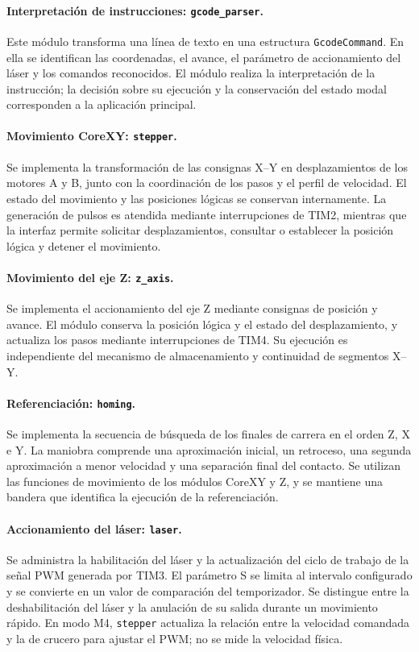 \documentclass[blue,fullpaper]{ludusofficial}  %
\begin{document}
\paragraph{Interpretación de instrucciones:
\texttt{gcode\_parser}.}
Este módulo transforma una línea de texto en una
estructura \texttt{GcodeCommand}. En ella se identifican
las coordenadas, el avance, el parámetro de accionamiento
del láser y los comandos reconocidos. El módulo realiza
la interpretación de la instrucción; la decisión sobre
su ejecución y la conservación del estado modal
corresponden a la aplicación principal.

\paragraph{Movimiento CoreXY: \texttt{stepper}.}
Se implementa la transformación de las consignas X--Y
en desplazamientos de los motores A y B, junto con la
coordinación de los pasos y el perfil de velocidad.
El estado del movimiento y las posiciones lógicas
se conservan internamente. La generación de pulsos
es atendida mediante interrupciones de TIM2, mientras
que la interfaz permite solicitar desplazamientos,
consultar o establecer la posición lógica y detener
el movimiento.

\paragraph{Movimiento del eje Z: \texttt{z\_axis}.}
Se implementa el accionamiento del eje Z mediante
consignas de posición y avance. El módulo conserva
la posición lógica y el estado del desplazamiento,
y actualiza los pasos mediante interrupciones de TIM4.
Su ejecución es independiente del mecanismo de
almacenamiento y continuidad de segmentos X--Y.

\paragraph{Referenciación: \texttt{homing}.}
Se implementa la secuencia de búsqueda de los finales
de carrera en el orden Z, X e Y. La maniobra comprende
una aproximación inicial, un retroceso, una segunda
aproximación a menor velocidad y una separación final
del contacto. Se utilizan las funciones de movimiento
de los módulos CoreXY y Z, y se mantiene una bandera
que identifica la ejecución de la referenciación.

\paragraph{Accionamiento del láser: \texttt{laser}.}
Se administra la habilitación del láser y la actualización
del ciclo de trabajo de la señal PWM generada por TIM3.
El parámetro S se limita al intervalo configurado y se
convierte en un valor de comparación del temporizador.
Se distingue entre la deshabilitación del láser y la
anulación de su salida durante un movimiento rápido. En modo M4, \texttt{stepper} actualiza la relación entre la velocidad comandada y la de crucero para ajustar el PWM; no se mide la velocidad física.
\end{document}
